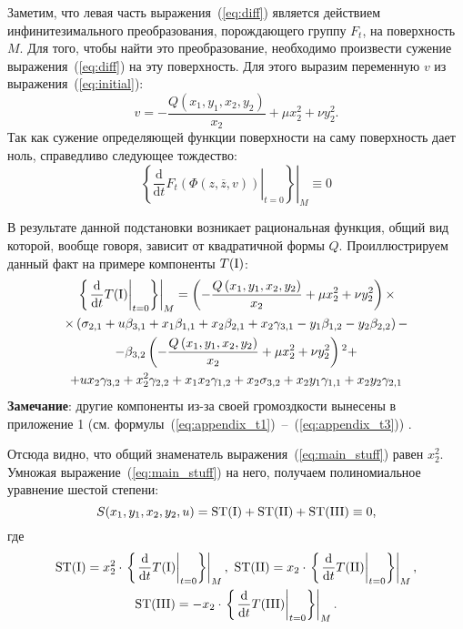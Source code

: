 \documentclass[../main.tex]{subfiles}
\begin{document}
Заметим, что левая часть выражения~(\ref{eq:diff}) является действием инфинитезимального преобразования, порождающего группу $F_t$, на поверхность $M$. Для того, чтобы найти это преобразование, необходимо произвести сужение выражения~(\ref{eq:diff}) на эту поверхность. Для этого выразим переменную $v$ из выражения~(\ref{eq:initial}):
\begin{equation}
v = -\frac{Q(x_1, y_1, x_2, y_2)}{x_2} + \mu x_2^2 + \nu y_2^2.
\end{equation}
Так как сужение определяющей функции поверхности на саму поверхность дает ноль, справедливо следующее тождество:
\begin{equation}\label{eq:main_stuff}
\left. \left\{\left.\frac{\mathrm d}{\mathrm{d}t} F_t\left(\Phi(z, \overline{z}, v)\right)\right|_{t = 0} \right\} \right|_M \equiv 0
\end{equation}

В результате данной подстановки возникает рациональная функция, общий вид которой, вообще говоря, зависит от квадратичной формы $Q$. Проиллюстрируем данный факт на примере компоненты $T(\mathrm{\RN{1}})$:
\begin{multline}
\left.\left\{ \left.\frac{\mathrm d}{\mathrm{d}t}T(\mathrm{\RN{1}})\right|_{t = 0}\right\} \right|_M =
\left(-\frac{Q\left(x_1,y_1,x_2,y_2\right)}{x_2} + \mu x_2^2 + \nu y_2^2\right) \times \\
\times \left( \sigma_{2,1} + u \beta_{3,1} + x_1 \beta_{1,1} + x_2 \beta_{2,1} + x_2 \gamma_{3,1} - y_1 \beta_{1,2} - y_2 \beta_{2,2} \right) - \\
- \beta_{3,2} \left(-\frac{Q\left(x_1,y_1,x_2,y_2\right)}{x_2}+\mu  x_2^2+\nu y_2^2\right){}^2 + \\
+ u x_2 \gamma_{3,2} + x_2^2 \gamma_{2,2} + x_1 x_2 \gamma_{1,2}+x_2 \sigma_{3,2}+x_2 y_1 \gamma_{1,1}+x_2 y_2 \gamma_{2,1}
\end{multline}
\textbf{Замечание}: другие компоненты из-за своей громоздкости вынесены в приложение 1 (см. формулы~(\ref{eq:appendix_t1})~--~(\ref{eq:appendix_t3})) .

Отсюда видно, что общий знаменатель выражения~(\ref{eq:main_stuff}) равен $x_2^2$. Умножая выражение~(\ref{eq:main_stuff}) на него, получаем полиномиальное уравнение шестой степени:
\begin{equation*}
S(x_1, y_1, x_2, y_2, u) = \mathrm{ST(\RN{1})} + \mathrm{ST(\RN{2})} + \mathrm{ST(\RN{3})} \equiv 0,
\end{equation*}
где 
\begin{gather*}
\mathrm{ST(\RN 1)} = x_2^2 \cdot \left.\left\{ \left.\frac{\mathrm d}{\mathrm{d}t}T(\mathrm{\RN{1}})\right|_{t = 0}\right\} \right|_M , \ \mathrm{ST(\RN 2)} = x_2 \cdot \left.\left\{ \left.\frac{\mathrm d}{\mathrm{d}t}T(\mathrm{\RN{2}})\right|_{t = 0}\right\} \right|_M, \\
\mathrm{ST(\RN 3)} = - x_2 \cdot \left.\left\{ \left.\frac{\mathrm d}{\mathrm{d}t}T(\mathrm{\RN{3}})\right|_{t = 0}\right\} \right|_M.
\end{gather*}
\end{document}
